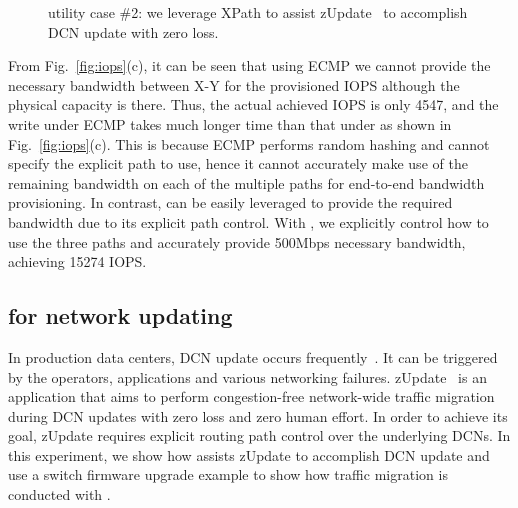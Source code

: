 \begin{figure}[t]
\centering
\vspace{-0.15in}
\vspace{-0.15in}

\vspace{-0.1in}
\caption[Optional caption for list of figures]{\sys utility case \#2: we leverage XPath to assist zUpdate~\cite{zupdate} to accomplish DCN update with zero loss.}
\label{fig:network-update}
\vspace{-0.2in}
\end{figure}

From Fig.~\ref{fig:iops}(c), it can be seen that using ECMP we cannot provide the necessary bandwidth between X-Y for the provisioned IOPS although the physical capacity is there. Thus, the actual achieved IOPS is only 4547, and the write under ECMP takes much longer time than that under \sys as shown in Fig.~\ref{fig:iops}(c). This is because ECMP performs random hashing and cannot specify the explicit path to use, hence it cannot accurately make use of the remaining bandwidth on each of the multiple paths for end-to-end bandwidth provisioning. In contrast, \sys can be easily leveraged to provide the required bandwidth due to its explicit path control. With \sys, we explicitly control how to use the three paths and accurately provide 500Mbps necessary bandwidth, achieving 15274 IOPS.


\subsection{\sys for network updating}\label{subsec:update}
\vspace{-0.05in}
In production data centers, DCN update occurs frequently~\cite{zupdate}. It can be triggered by the operators, applications and various networking failures. zUpdate~\cite{zupdate} is an application that aims to perform congestion-free network-wide traffic migration during DCN updates with zero loss and zero human effort. In order to achieve its goal, zUpdate requires explicit routing path control over the underlying DCNs. In this experiment, we show how \sys assists zUpdate to accomplish DCN update and use a switch firmware upgrade example to show how traffic migration is conducted with \sys.

